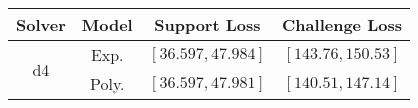 \begin{tabular}{cc|c|c} 
\hline 
 Solver & Model & Support Loss  & Challenge Loss \tabularnewline\hline 
\hline 
\multirow{2}{*}{d4} & Exp. & $\left[36.597,47.984\right]$ & $\left[143.76,150.53\right]$ \tabularnewline 
 & Poly. & $\left[36.597,47.981\right]$ & $\left[140.51,147.14\right]$ \tabularnewline 
\hline 
\end{tabular} 

